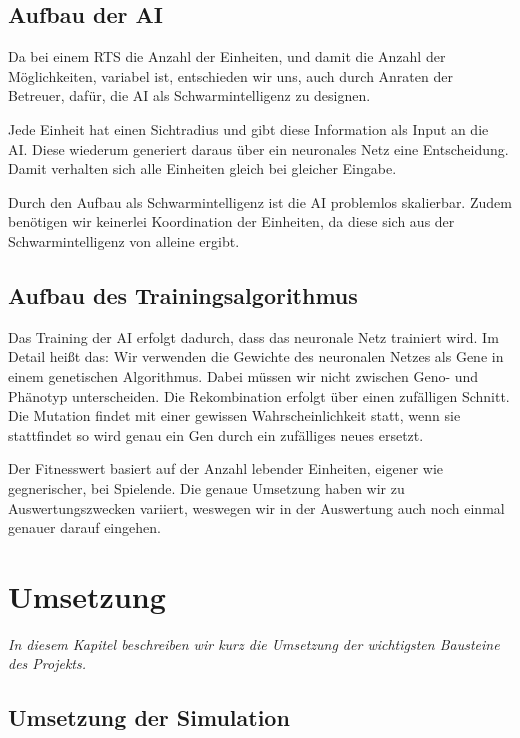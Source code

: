\documentclass[
	12pt,
	a4paper,
	BCOR10mm,
	DIV14,
	headsepline,
	usegeometry,
]{scrreprt}
\begin{document}
\section{Aufbau der AI}
Da bei einem RTS die Anzahl der Einheiten, und damit die Anzahl der Möglichkeiten, variabel ist, entschieden wir uns, auch durch Anraten der Betreuer, dafür, die AI als Schwarmintelligenz zu designen.

Jede Einheit hat einen Sichtradius und gibt diese Information als Input an die AI. 
Diese wiederum generiert daraus über ein neuronales Netz eine Entscheidung. 
Damit verhalten sich alle Einheiten gleich bei gleicher Eingabe. 

Durch den Aufbau als Schwarmintelligenz ist die AI problemlos skalierbar. 
Zudem benötigen wir keinerlei Koordination der Einheiten, da diese sich aus der Schwarmintelligenz von alleine ergibt.

\section{Aufbau des Trainingsalgorithmus}
Das Training der AI erfolgt dadurch, dass das neuronale Netz trainiert wird.
Im Detail heißt das: Wir verwenden die Gewichte des neuronalen Netzes als Gene in einem genetischen Algorithmus.
Dabei müssen wir nicht zwischen Geno- und Phänotyp unterscheiden.
Die Rekombination erfolgt über einen zufälligen Schnitt.
Die Mutation findet mit einer gewissen Wahrscheinlichkeit statt, wenn sie stattfindet so wird genau ein Gen durch ein zufälliges neues ersetzt.

Der Fitnesswert basiert auf der Anzahl lebender Einheiten, eigener wie gegnerischer, bei Spielende.
Die genaue Umsetzung haben wir zu Auswertungszwecken variiert, weswegen wir in der Auswertung auch noch einmal genauer darauf eingehen.

\chapter{Umsetzung}
\label{Umsetzung}

\textit{%
In diesem Kapitel beschreiben wir kurz die Umsetzung der wichtigsten Bausteine des Projekts.
}

\bigskip

\section{Umsetzung der Simulation}
\end{document}
